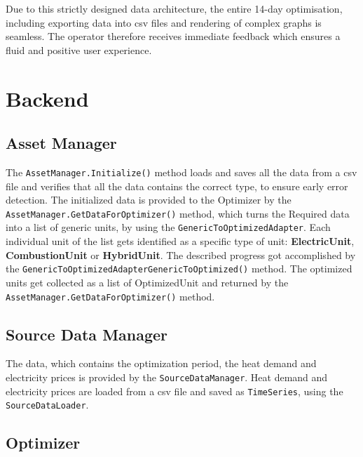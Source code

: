 \noindent Due to this strictly designed data architecture, the entire 14-day optimisation, including exporting data into \acrshort{csv} files and rendering of complex graphs is seamless. The operator therefore receives immediate feedback which ensures a fluid and positive user experience.

\section{Backend}

\subsection{Asset Manager}

The \texttt{AssetManager.}\allowbreak\texttt{Initialize()} method loads and saves all the data from a \acrshort{csv} file and verifies that all the data contains the correct type, to ensure early error detection. 
The initialized data is provided to the Optimizer by the \texttt{AssetManager.}\allowbreak\texttt{GetDataForOptimizer()} method, which turns the Required data into a list of generic units, by using the \texttt{GenericToOptimizedAdapter}.
Each individual unit of the list gets identified as a specific type of unit: \textbf{ElectricUnit}, \textbf{CombustionUnit} or \textbf{HybridUnit}.
The described progress got accomplished by the \texttt{GenericToOptimizedAdapter}\allowbreak\texttt{GenericToOptimized()} method.
The optimized units get collected as a list of OptimizedUnit and returned by the \texttt{AssetManager.}\allowbreak\texttt{GetDataForOptimizer()} method. 


\subsection{Source Data Manager}

The data, which contains the optimization period, the heat demand and electricity prices is provided by the \texttt{SourceDataManager}. Heat demand and electricity prices are loaded from a \acrshort{csv} file and saved as \texttt{TimeSeries}, using the \texttt{SourceDataLoader}. 

\subsection{Optimizer}


